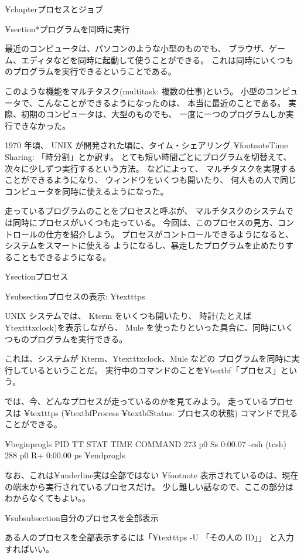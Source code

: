 ¥chapter{プロセスとジョブ}

¥section*{プログラムを同時に実行}

最近のコンピュータは、パソコンのような小型のものでも、
ブラウザ、ゲーム、エディタなどを同時に起動して使うことができる。
これは同時にいくつものプログラムを実行できるということである。

このような機能をマルチタスク(multitask: 複数の仕事)という。
小型のコンピュータで、こんなことができるようになったのは、
本当に最近のことである。
実際、初期のコンピュータは、大型のものでも、
一度に一つのプログラムしか実行できなかった。

1970 年頃、 UNIX が開発された頃に、タイム・シェアリング
¥footnote{Time Sharing: 「時分割」とか訳す。
とても短い時間ごとにプログラムを切替えて、次々に少しずつ実行するという方法。}
などによって、
マルチタスクを実現することができるようになり、
ウィンドウをいくつも開いたり、
何人もの人で同じコンピュータを同時に使えるようになった。

走っているプログラムのことをプロセスと呼ぶが、
マルチタスクのシステムでは同時にプロセスがいくつも走っている。
今回は、このプロセスの見方、コントロールの仕方を紹介しよう。
プロセスがコントロールできるようになると、システムをスマートに使える
ようになるし、暴走したプログラムを止めたりすることもできるようになる。

¥section{プロセス}

¥subsection{プロセスの表示: ¥texttt{ps}}

 UNIX システムでは、 Kterm をいくつも開いたり、
時計(たとえば ¥texttt{xclock})を表示しながら、
 Mule を使ったりといった具合に、同時にいくつものプログラムを実行できる。

これは、システムが Kterm、¥texttt{xclock}、Mule などの
プログラムを同時に実行しているということだ。
実行中のコマンドのことを¥textbf{「プロセス」}という。

では、今、どんなプロセスが走っているのかを見てみよう。
走っているプロセスは ¥texttt{ps}
(¥textbf{P}rocess ¥textbf{S}tatus: プロセスの状態) コマンドで見ることができる。

¥begin{progls}
  PID  TT  STAT      TIME COMMAND
  273  p0  Ss     0:00.07 -csh (tcsh)
  288  p0  R+     0:00.00 ps
%
¥end{progls}

なお、これは¥underline{実は全部ではない}
¥footnote{
表示されているのは、現在の端末から実行されているプロセスだけ。
少し難しい話なので、ここの部分はわからなくてもよい。}。

¥subsubsection{自分のプロセスを全部表示}

ある人のプロセスを全部表示するには「¥texttt{ps -U 「その人の ID」}」
と入力すればいい。

